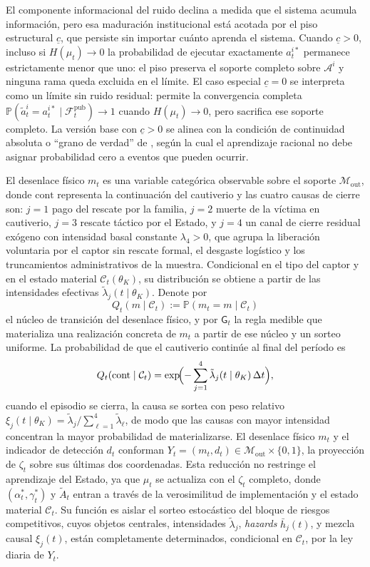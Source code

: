 \documentclass[review,authoryear,12pt]{elsarticle}
\theoremstyle{plain}
\theoremstyle{definition}
\newcommand{\Prob}{\mathbb{P}}
\newcommand{\1}{\mathbf{1}}
\begin{document}
El componente informacional del ruido declina a medida que el sistema acumula información, pero esa maduración institucional está acotada por el piso estructural $\underline{c}$, que persiste sin importar cuánto aprenda el sistema. Cuando $\underline{c}>0$, incluso si $H(\mu_t)\to 0$ la probabilidad de ejecutar exactamente $a_t^{i\ast}$ permanece estrictamente menor que uno: el piso preserva el soporte completo sobre $\mathcal{A}^i$ y ninguna rama queda excluida en el límite. El caso especial $\underline{c}=0$ se interpreta como un límite sin ruido residual: permite la convergencia completa $\Prob(\tilde{a}_t^i=a_t^{i\ast}\mid\mathcal{F}_t^{\mathrm{pub}})\to 1$ cuando $H(\mu_t)\to 0$, pero sacrifica ese soporte completo. La versión base con $\underline{c}>0$ se alinea con la condición de continuidad absoluta o ``grano de verdad'' de \citet{KalaiLehrer1993}, según la cual el aprendizaje racional no debe asignar probabilidad cero a eventos que pueden ocurrir.

El desenlace físico $m_t$ es una variable categórica observable sobre el soporte $\mathcal{M}_{\mathrm{out}}$, donde $\mathrm{cont}$ representa la continuación del cautiverio y las cuatro causas de cierre son: $j=1$ pago del rescate por la familia, $j=2$ muerte de la víctima en cautiverio, $j=3$ rescate táctico por el Estado, y $j=4$ un canal de cierre residual exógeno con intensidad basal constante $\lambda_4>0$, que agrupa la liberación voluntaria por el captor sin rescate formal, el desgaste logístico y los truncamientos administrativos de la muestra. Condicional en el tipo del captor y en el estado material $\mathcal{C}_t(\theta_K)$, su distribución se obtiene a partir de las intensidades efectivas $\tilde{\lambda}_j(t\mid\theta_K)$. Denote por
\[
Q_t(m\mid\mathcal{C}_t):=\Prob(m_t=m\mid\mathcal{C}_t)
\]
el núcleo de transición del desenlace físico, y por $\mathsf{G}_t$ la regla medible que materializa una realización concreta de $m_t$ a partir de ese núcleo y un sorteo uniforme. La probabilidad de que el cautiverio continúe al final del período es
\[
Q_t(\mathrm{cont}\mid\mathcal{C}_t)=\exp\!\Bigl(-\sum_{j=1}^{4}\tilde{\lambda}_j(t\mid\theta_K)\,\Delta t\Bigr),
\]
cuando el episodio se cierra, la causa se sortea con peso relativo $\xi_j(t\mid\theta_K)=\tilde{\lambda}_j/\sum_{\ell=1}^{4}\tilde{\lambda}_\ell$, de modo que las causas con mayor intensidad concentran la mayor probabilidad de materializarse. El desenlace físico $m_t$ y el indicador de detección $d_t$ conforman $Y_t=(m_t,d_t)\in\mathcal{M}_{\mathrm{out}}\times\{0,1\}$, la proyección de $\zeta_t$ sobre sus últimas dos coordenadas. Esta reducción no restringe el aprendizaje del Estado, ya que $\mu_t$ se actualiza con el $\zeta_t$ completo, donde $(\alpha_t^\ast,\gamma_t^\ast)$ y $\tilde{A}_t$ entran a través de la verosimilitud de implementación y el estado material $\mathcal{C}_t$. Su función es aislar el sorteo estocástico del bloque de riesgos competitivos, cuyos objetos centrales, intensidades $\tilde{\lambda}_j$, \textit{hazards} $\bar{h}_j(t)$, y mezcla causal $\xi_j(t)$, están completamente determinados, condicional en $\mathcal{C}_t$, por la ley diaria de $Y_t$.
\end{document}
